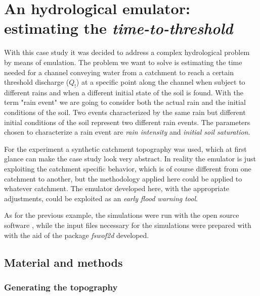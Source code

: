\newpage

\section{An hydrological emulator: estimating the \textit{time-to-threshold}}

With this case study it was decided to address a complex hydrological problem by means of emulation.
The problem we want to solve is estimating the time needed for a channel conveying water from a catchment to reach a certain threshold discharge ($Q_!$) at a specific point along the channel when subject to different rains and when a different initial state of the soil is found.
With the term "rain event" we are going to consider both the actual rain and the initial conditions of the soil.
Two events characterized by the same rain but different initial conditions  of the soil represent two different rain events. The parameters chosen to characterize a rain event are \emph{rain intensity} and \emph{initial soil saturation}.

For the experiment a synthetic catchment topography was used, which at first glance can make the case study look very abstract.
In reality the emulator is just exploiting the catchment specific behavior, which is of course different from one catchment to another, but the methodology applied here could be applied to whatever catchment.
The emulator developed here, with the appropriate adjustments, could be exploited as an \emph{early flood warning tool}.

As for the previous example, the simulations were run with the open source software , while the input files necessary for the simulations were prepared with  with the aid of the package \textit{fswof2d} developed.


\subsection{Material and methods}
\subsubsection{Generating the topography}

